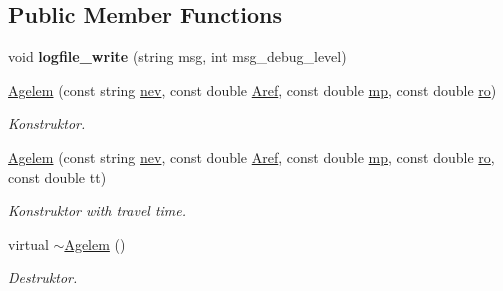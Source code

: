 \subsection*{Public Member Functions}
\begin{DoxyCompactItemize}
\item 
\hypertarget{class_agelem_a9dd12f555cf1927a743f2672a1545c61}{}\label{class_agelem_a9dd12f555cf1927a743f2672a1545c61} 
void {\bfseries logfile\+\_\+write} (string msg, int msg\+\_\+debug\+\_\+level)
\item 
\hypertarget{class_agelem_a72fb0a2a58cfbcbcce00aa09ba40d8a0}{}\label{class_agelem_a72fb0a2a58cfbcbcce00aa09ba40d8a0} 
\hyperlink{class_agelem_a72fb0a2a58cfbcbcce00aa09ba40d8a0}{Agelem} (const string \hyperlink{class_agelem_abe92b7e3912367d5d1caf6b277ca0b7d}{nev}, const double \hyperlink{class_agelem_a3f8668febc2958fd539997d537552f17}{Aref}, const double \hyperlink{class_agelem_a1377d80d8511cc4adacccba31d28282d}{mp}, const double \hyperlink{class_agelem_a520072191e53f368a04ca80b8b583a3f}{ro})
\begin{DoxyCompactList}\small\item\em Konstruktor. \end{DoxyCompactList}\item 
\hypertarget{class_agelem_ad8c13af2ccc41f2b68a693518c1e850e}{}\label{class_agelem_ad8c13af2ccc41f2b68a693518c1e850e} 
\hyperlink{class_agelem_ad8c13af2ccc41f2b68a693518c1e850e}{Agelem} (const string \hyperlink{class_agelem_abe92b7e3912367d5d1caf6b277ca0b7d}{nev}, const double \hyperlink{class_agelem_a3f8668febc2958fd539997d537552f17}{Aref}, const double \hyperlink{class_agelem_a1377d80d8511cc4adacccba31d28282d}{mp}, const double \hyperlink{class_agelem_a520072191e53f368a04ca80b8b583a3f}{ro}, const double tt)
\begin{DoxyCompactList}\small\item\em Konstruktor with travel time. \end{DoxyCompactList}\item 
\hypertarget{class_agelem_a62ea4415f524e75918a2dde15e8bd560}{}\label{class_agelem_a62ea4415f524e75918a2dde15e8bd560} 
virtual \hyperlink{class_agelem_a62ea4415f524e75918a2dde15e8bd560}{$\sim$\+Agelem} ()
\begin{DoxyCompactList}\small\item\em Destruktor. \end{DoxyCompactList}\item 
\hypertarget{class_agelem_a2e6c4688cdbdf17c6d3bde0c6c08ff49}{}\label{class_agelem_a2e6c4688cdbdf17c6d3bde0c6c08ff49} 

\end{DoxyCompactItemize}
